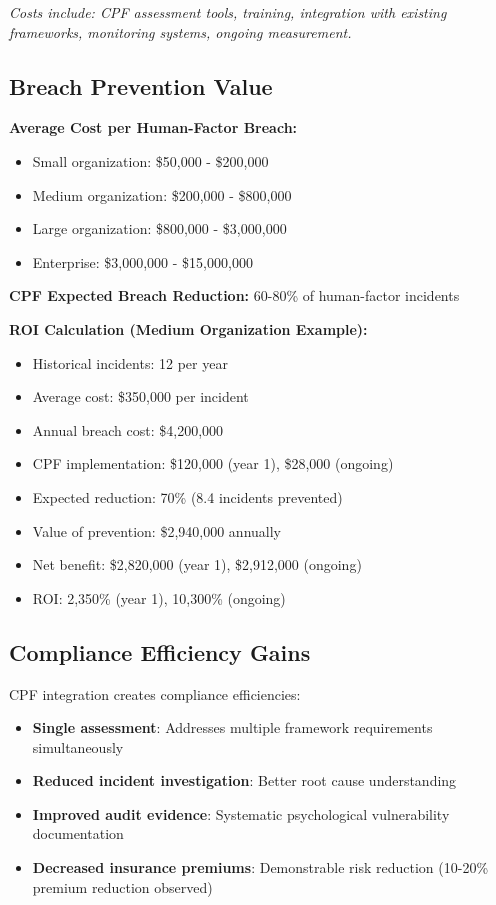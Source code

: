 \documentclass[11pt,a4paper]{article}
\begin{document}
\textit{Costs include: CPF assessment tools, training, integration with existing frameworks, monitoring systems, ongoing measurement.}

\subsection{Breach Prevention Value}

\textbf{Average Cost per Human-Factor Breach:}
\begin{itemize}
\item Small organization: \$50,000 - \$200,000
\item Medium organization: \$200,000 - \$800,000
\item Large organization: \$800,000 - \$3,000,000
\item Enterprise: \$3,000,000 - \$15,000,000
\end{itemize}

\textbf{CPF Expected Breach Reduction:} 60-80\% of human-factor incidents

\textbf{ROI Calculation (Medium Organization Example):}

\begin{itemize}
\item Historical incidents: 12 per year
\item Average cost: \$350,000 per incident
\item Annual breach cost: \$4,200,000
\item CPF implementation: \$120,000 (year 1), \$28,000 (ongoing)
\item Expected reduction: 70\% (8.4 incidents prevented)
\item Value of prevention: \$2,940,000 annually
\item Net benefit: \$2,820,000 (year 1), \$2,912,000 (ongoing)
\item ROI: 2,350\% (year 1), 10,300\% (ongoing)
\end{itemize}

\subsection{Compliance Efficiency Gains}

CPF integration creates compliance efficiencies:

\begin{itemize}
\item \textbf{Single assessment}: Addresses multiple framework requirements simultaneously
\item \textbf{Reduced incident investigation}: Better root cause understanding
\item \textbf{Improved audit evidence}: Systematic psychological vulnerability documentation
\item \textbf{Decreased insurance premiums}: Demonstrable risk reduction (10-20\% premium reduction observed)
\end{itemize}
\end{document}

